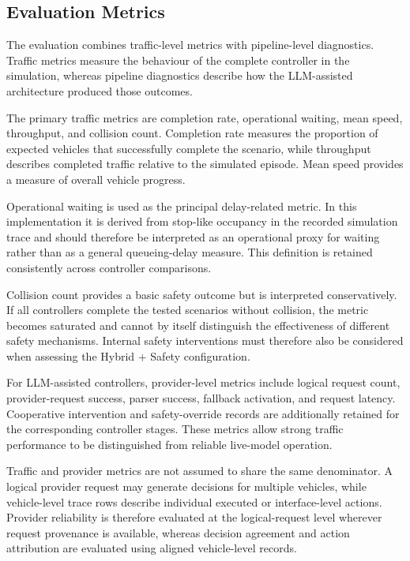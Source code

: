 \documentclass[letterpaper,10pt,conference]{ieeeconf}
\begin{document}
\subsection{Evaluation Metrics}



The evaluation combines traffic-level metrics with pipeline-level diagnostics. Traffic metrics measure the behaviour of the complete controller in the simulation, whereas pipeline diagnostics describe how the LLM-assisted architecture produced those outcomes.



The primary traffic metrics are completion rate, operational waiting, mean speed, throughput, and collision count. Completion rate measures the proportion of expected vehicles that successfully complete the scenario, while throughput describes completed traffic relative to the simulated episode. Mean speed provides a measure of overall vehicle progress.



Operational waiting is used as the principal delay-related metric. In this implementation it is derived from stop-like occupancy in the recorded simulation trace and should therefore be interpreted as an operational proxy for waiting rather than as a general queueing-delay measure. This definition is retained consistently across controller comparisons.



Collision count provides a basic safety outcome but is interpreted conservatively. If all controllers complete the tested scenarios without collision, the metric becomes saturated and cannot by itself distinguish the effectiveness of different safety mechanisms. Internal safety interventions must therefore also be considered when assessing the Hybrid + Safety configuration.



For LLM-assisted controllers, provider-level metrics include logical request count, provider-request success, parser success, fallback activation, and request latency. Cooperative intervention and safety-override records are additionally retained for the corresponding controller stages. These metrics allow strong traffic performance to be distinguished from reliable live-model operation.



Traffic and provider metrics are not assumed to share the same denominator. A logical provider request may generate decisions for multiple vehicles, while vehicle-level trace rows describe individual executed or interface-level actions. Provider reliability is therefore evaluated at the logical-request level wherever request provenance is available, whereas decision agreement and action attribution are evaluated using aligned vehicle-level records.
\end{document}
